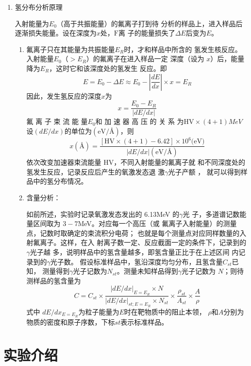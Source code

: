 \documentclass{article}
\begin{document}
\begin{enumerate}
  \item   氢分布分析原理

  入射能量为$E_0$（高于共振能量）的氟离子打到待
  分析的样品上，进入样品后逐渐损失能量。设在深度为$x$处，$\text{F}$离
  子的能量损失了$\Delta E$后变为$E$。
  \begin{enumerate}
  \item 氟离子只在其能量为共振能量$E_R$时，才和样品中所含的
氢发生核反应。入射能量$E_0$（$>E_R$）的氟离子在进入样品一定
深度（设为 $x$）后，能量降为$E_R$，这时它和该深度处的氢发生
反应。即
\begin{equation}
E = E_0 -\Delta E \approx E_0 - |\frac{dE}{dx}|\times x = E_R
\end{equation}
因此，发生氢反应的深度$x$为
\begin{equation}
x=\frac{E_0-E_R}{|dE/dx|}
\end{equation}
氟 离 子 束 流 能 量$E_0$和 加 速 器 高 压 的 关 系 为$\text{HV}\times(4+1)\si{MeV}$
设$(dE/dx)$的单位为$(\text{eV/\AA})$，则
\begin{equation}
x(\text{\AA})=\frac{[\text{HV}\times(4+1)-6.42]\times10^{6}\text{(eV)}}{|dE/dx|(\text{eV}/\text{\AA})}
\end{equation}
依次改变加速器束流能量 HV，不同入射能量的氟离子就
和不同深度处的氢发生反应，记录反应后产生的氧激发态退
激$\gamma$光子产额 ， 就可以得到样品中的氢分布情况。
\item 含量分析：

如前所述，实验时记录氧激发态发出的 6.13MeV 的$\gamma$光
子，多道谱记数能量区间取为 $3-7$MeV。对应每一个高压（或
氟离子入射能量）的测量点，记数时取确定的束流积分电荷；
也就是每个测量点对应同样数量的入射氟离子。这样，在入
射离子数一定、反应截面一定的条件下，记录到的$\gamma$光子越
多，说明样品中的氢含量越多，即氢含量正比于在上述区间
内记录到的$\gamma$光子数。
假设标准样品中，氢沿深度均匀分布，且氢含量$C_{st}$已知，
测量得到$\gamma$光子记数为$N_{st}$。测量未知样品得到$\gamma$光子记数为
$N$；则待测样品的氢含量为
\begin{equation}
C = C_{st}\times\frac{|dE/dx|_{E=E_R}\times N}{|dE/dx|_{st;E=E_R}\times N_{st}}\times\frac{\rho_{st}}{A_{st}}\times\frac{A}{\rho}
\end{equation}
式中
$dE/dx_{E=E_R}$为粒子能量为$E$时在靶物质中的阻止本领，
$\rho$和$A$分别为物质的密度和原子序数，下标$st$表示标准样品。
  \end{enumerate}
\end{enumerate}
\section{实验介绍}
\end{document}
